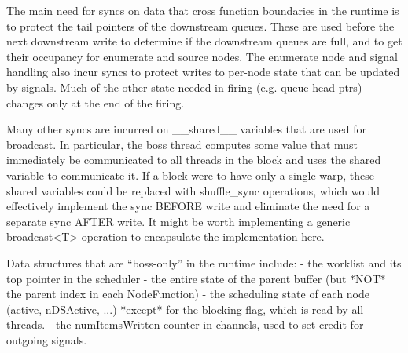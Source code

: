 The main need for syncs on data that cross function boundaries in the
runtime is to protect the tail pointers of the downstream
queues. These are used before the next downstream write to determine
if the downstream queues are full, and to get their occupancy for
enumerate and source nodes.  The enumerate node and signal handling
also incur syncs to protect writes to per-node state that can be
updated by signals.  Much of the other state needed in firing
(e.g. queue head ptrs) changes only at the end of the firing.

Many other syncs are incurred on __shared__ variables that are used
for broadcast.  In particular, the boss thread computes some value
that must immediately be communicated to all threads in the block and
uses the shared variable to communicate it.  If a block were to have
only a single warp, these shared variables could be replaced with
shuffle_sync operations, which would effectively implement the sync
BEFORE write and eliminate the need for a separate sync AFTER write.
It might be worth implementing a generic broadcast<T> operation to
encapsulate the implementation here.

Data structures that are ``boss-only'' in the runtime include:
 - the worklist and its top pointer in the scheduler
 - the entire state of the parent buffer (but *NOT* the parent index
   in each NodeFunction)
 - the scheduling state of each node (active, nDSActive, ...) *except*
   for the blocking flag, which is read by all threads.
 - the numItemsWritten counter in channels, used to set credit for
   outgoing signals.
